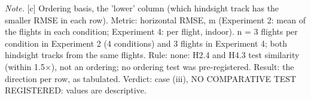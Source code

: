 \begin{table}[htbp]
\textit{Note.} [c] Ordering basis, the 'lower' column (which hindsight track has the smaller RMSE in each row). Metric: horizontal RMSE, m (Experiment 2: mean of the flights in each condition; Experiment 4: per flight, indoor). n = 3 flights per condition in Experiment 2 (4 conditions) and 3 flights in Experiment 4; both hindsight tracks from the same flights. Rule: none: H2.4 and H4.3 test similarity (within 1.5$\times$), not an ordering; no ordering test was pre-registered. Result: the direction per row, as tabulated. Verdict: case (iii), NO COMPARATIVE TEST REGISTERED: values are descriptive.\par
\end{table}
